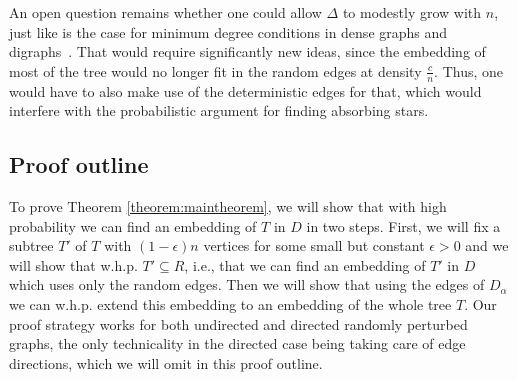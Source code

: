 \documentclass[10pt, a4paper]{article}
\theoremstyle{remark}
\begin{document}
An open question remains whether one could allow $\Delta$ to modestly grow with $n$, just like is the case for minimum degree conditions in dense graphs and digraphs~\cite{kathapurkar22,kss2001}.
That would require significantly new ideas, since the embedding of most of the tree would no longer fit in the random edges at density $\frac{c}{n}$. Thus, one would have to also make use of the deterministic edges for that, which would interfere with the probabilistic argument for finding absorbing stars. 

\subsection*{Proof outline}

To prove Theorem \ref{theorem:maintheorem}, we will show that with high probability we can find an embedding of $T$ in $D$ in two steps.
First, we will fix a subtree $T'$ of $T$ with $(1-\epsilon)n$ vertices for some small but constant $\epsilon > 0$ and we will show that w.h.p. $T' \subseteq R$, i.e., that we can find an embedding of $T'$ in $D$ which uses only the random edges.
Then we will show that using the edges of $D_\alpha$ we can w.h.p. extend this embedding to an embedding of the whole tree $T$.
Our proof strategy works for both undirected and directed randomly perturbed graphs, the only technicality in the directed case being taking care of edge directions, which we will omit in this proof outline.
\end{document}
